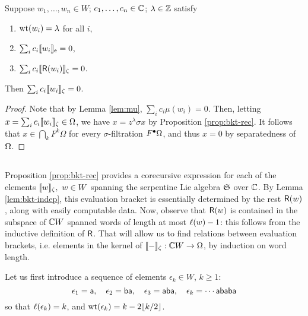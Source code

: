 \begin{lem}\label{lem:bkt-indep}
Suppose $w_1,\dots,w_n\in W$; $c_1,\dots,c_n\in{\mathbb{C}}$; $\lambda\in{\mathbb{Z}}$ satisfy
\begin{enumerate}
        \item $\operatorname{\mathrm{wt}}(w_i) = \lambda$ for all $i$,
        \item $\sum_i c_i \llbracket{w_i}\rrbracket_{\mathsf{e}}=0$,
        \item $\sum_i c_i \llbracket{\mathsf{R}(w_i)}\rrbracket_\zeta=0$.
\end{enumerate}
Then $\sum_i c_i \llbracket{w_i}\rrbracket_\zeta=0$.
\end{lem}
\begin{proof} Note that by Lemma \ref{lem:mu}, $\sum_i c_i \mu(w_i)=0$. Then, letting $x = \sum_i c_i \llbracket{w_i}\rrbracket_\zeta\in\Omega$,
we have $x = z^\lambda \sigma x$ by Proposition \ref{prop:bkt-rec}. It follows that $x\in\bigcap_k F^k\Omega$ for every 
$\sigma$-filtration $F^\bullet\Omega$, and thus $x = 0$ by separatedness of $\Omega$.\end{proof}

\subsection{}
Proposition \ref{prop:bkt-rec} provides a corecursive expression for each of the elements $\llbracket{w}\rrbracket_\zeta,\ w\in W$
spanning the serpentine Lie algebra $\mathfrak{S}$ over ${\mathbb{C}}$. By Lemma \ref{lem:bkt-indep}, this evaluation bracket is
essentially determined by the rest $\mathsf{R}(w)$, along with easily computable data. Now, observe
that $\mathsf{R}(w)$ is contained in the subspace of ${{\mathbb{C}}{}W}$ spanned words of length at most $\ell(w)-1$:
this follows from the inductive definition of $\mathsf{R}$. That will allow us to find relations
between evaluation brackets, i.e. elements in the kernel of $\llbracket{-}\rrbracket_\zeta:{{\mathbb{C}}{}W}\to\Omega$, by induction on
word length.

Let us first introduce a sequence of elements $\epsilon_k\in W$, $k\ge1$:
\[
        \epsilon_1=\mathsf{a},\quad \epsilon_2=\mathsf{b}\mathsf{a},\quad\epsilon_3 = \mathsf{a}\mathsf{b}\mathsf{a},\quad\epsilon_k = \cdots\mathsf{a}\mathsf{b}\mathsf{a}\mathsf{b}\mathsf{a}
\]
so that $\ell(\epsilon_k)=k$, and $\operatorname{\mathrm{wt}}(\epsilon_k)=k - 2\lfloor k/2\rfloor$.

